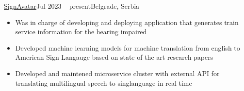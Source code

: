 \documentclass[10pt,a4paper]{source/altacv}
\begin{document}
\tagline{}

%

\begin{fullwidth}
\makecvheader 
\end{fullwidth}

%




 {\href{https://signavatar.org/}{SignAvatar}}{Jul 2023 -- present}{Belgrade, Serbia}
\begin{itemize}
    \item   \small{Was in charge of developing and deploying application that generates train service information for the hearing impaired}
    \item   \small{Developed machine learning models for machine translation from english to American Sign Langauge based on state-of-the-art research papers}
    \item   \small{Developed and maintened microservice cluster with external API for translating multilingual speech to singlanguage in real-time}
    \\
    \smallskip
    \smallskip
       

\end{itemize}
\end{document}
